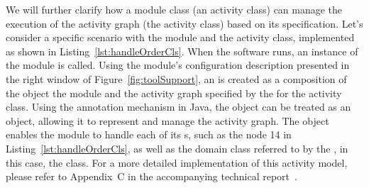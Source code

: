 We will further clarify how a module class (\wrt an activity class) can manage the execution of the activity graph (\wrt the activity class) based on its \agl specification. Let's consider a specific scenario with the  module and the  activity class, implemented as shown in Listing~\ref{lst:handleOrderCls}. When the software runs, an instance of the  module is called. Using the module's configuration description presented in the right window of Figure~\ref{fig:toolSupport}, an  is created as a composition of the  object \wrt the  module and the activity graph specified by the \agl for the  activity class. %
%
Using the annotation mechanism in Java, the  object can be treated as an  object, allowing it to represent and manage the activity graph. The  object enables the  module to handle each of its s, such as the  \wrt node 14 in Listing~\ref{lst:handleOrderCls}, as well as the domain class referred to by the , in this case, the  class. For a more detailed implementation of this activity model, please refer to Appendix~C in the accompanying technical report~\cite{dang2023aglTechReport}.

